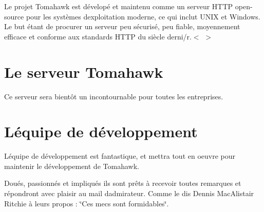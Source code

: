 Le projet Tomahawk est dévelopé et maintenu comme un serveur H\+T\+TP open-\/source pour les systèmes d\textquotesingle{}exploitation moderne, ce qui inclut U\+N\+IX et Windows. Le but étant de procurer un serveur peu sécurisé, peu fiable, moyennement efficace et conforme aux standards H\+T\+TP du siècle derni/r.$<${\ttfamily } $>$

\section*{Le serveur Tomahawk}

Ce serveur sera bientôt un incontournable pour toutes les entreprises.

\section*{L\textquotesingle{}équipe de développement}

L\textquotesingle{}équipe de développement est fantastique, et mettra tout en oeuvre pour maintenir le développement de Tomahawk. 

Doués, passionnés et impliqués ils sont prêts à recevoir toutes remarques et répondront avec plaisir au mail d\textquotesingle{}admirateur. Comme le dis Dennis Mac\+Alistair Ritchie à leurs propos \+: \char`\"{}\+Ces mecs sont formidables\char`\"{}.